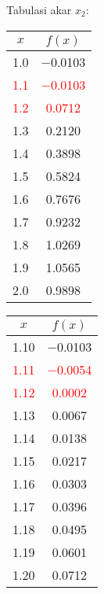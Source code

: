 \documentclass{article}
\begin{document}
\begin{enumerate}
\begin{enumerate}
        Tabulasi akar $x_2$: \\
        \begin{tabular}{|c|c|}
            \hline
            $x$   & $f(x)$ \\
            \hline
            \num{1,0} & \num{-0,0103} \\
            \textcolor{red}{\num{1,1}} & \textcolor{red}{\num{-0,0103}} \\
            \textcolor{red}{\num{1,2}} & \textcolor{red}{\num{0,0712}} \\
            \num{1,3} & \num{0,2120} \\
            \num{1,4} & \num{0,3898} \\
            \num{1,5} & \num{0,5824} \\
            \num{1,6} & \num{0,7676} \\
            \num{1,7} & \num{0,9232} \\
            \num{1,8} & \num{1,0269} \\
            \num{1,9} & \num{1,0565} \\
            \num{2,0} & \num{0,9898} \\
            \hline
            \end{tabular}\quad
            \begin{tabular}{|c|c|}
            \hline
            $x$   & $f(x)$ \\
            \hline
            \num{1,10} & \num{-0,0103} \\
            \textcolor{red}{\num{1,11}} & \textcolor{red}{\num{-0,0054}} \\
            \textcolor{red}{\num{1,12}} & \textcolor{red}{\num{0,0002}} \\
            \num{1,13} & \num{0,0067} \\
            \num{1,14} & \num{0,0138} \\
            \num{1,15} & \num{0,0217} \\
            \num{1,16} & \num{0,0303} \\
            \num{1,17} & \num{0,0396} \\
            \num{1,18} & \num{0,0495} \\
            \num{1,19} & \num{0,0601} \\
            \num{1,20} & \num{0,0712} \\
            \hline
            \end{tabular}\quad
            \begin{tabular}{|c|c|}

\end{tabular}
\end{enumerate}
\end{enumerate}
\end{document}
